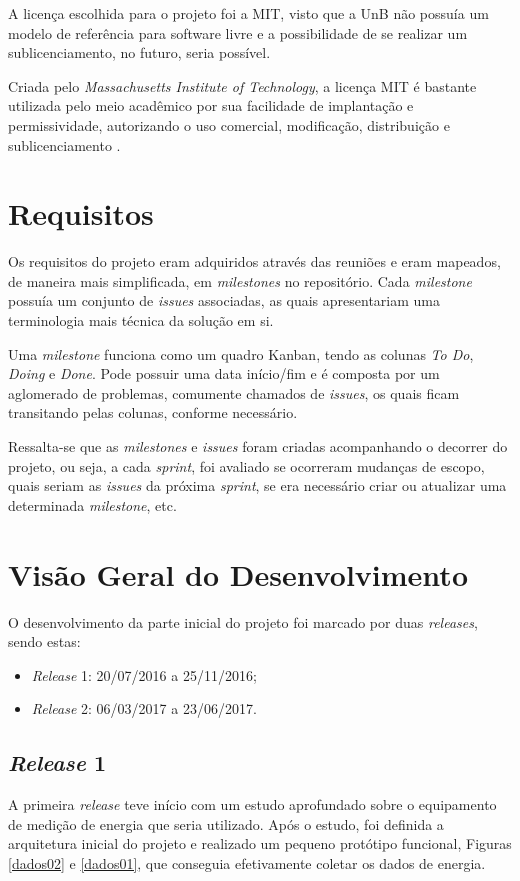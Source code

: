 A licença escolhida para o projeto foi a MIT, visto que a UnB não possuía um modelo de referência para software livre e a possibilidade de se realizar um sublicenciamento, no futuro, seria possível.

Criada pelo \textit{Massachusetts Institute of Technology}, a licença MIT é bastante utilizada pelo meio acadêmico por sua facilidade de implantação e permissividade, autorizando o uso comercial, modificação, distribuição e sublicenciamento \cite{mit_license}.

\section{Requisitos}
Os requisitos do projeto eram adquiridos através das reuniões e eram mapeados, de maneira mais simplificada, em \textit{milestones} \cite{gitlab} no repositório. Cada \textit{milestone} possuía um conjunto de \textit{issues} associadas, as quais apresentariam uma terminologia mais técnica da solução em si.

Uma \textit{milestone} funciona como um quadro Kanban, tendo as colunas \textit{To Do}, \textit{Doing} e \textit{Done}. Pode possuir uma data início/fim e é composta por um aglomerado de problemas, comumente chamados de \textit{issues}, os quais ficam transitando pelas colunas, conforme necessário.

Ressalta-se que as \textit{milestones} e \textit{issues} foram criadas acompanhando o decorrer do projeto, ou seja, a cada \textit{sprint}, foi avaliado se ocorreram mudanças de escopo, quais seriam as \textit{issues} da próxima \textit{sprint}, se era necessário criar ou atualizar uma determinada \textit{milestone}, etc.

\section{Visão Geral do Desenvolvimento}
O desenvolvimento da parte inicial do projeto foi marcado por duas \textit{releases}, sendo estas:

\begin{itemize}
    \item \textit{Release} 1: 20/07/2016 a 25/11/2016;
    \item \textit{Release} 2: 06/03/2017 a 23/06/2017.
\end{itemize}

\subsection{\textit{Release} 1}
A primeira \textit{release} teve início com um estudo aprofundado sobre o equipamento de medição de energia que seria utilizado. Após o estudo, foi definida a arquitetura inicial do projeto e realizado um pequeno protótipo funcional, Figuras \ref{dados02} e \ref{dados01}, que conseguia efetivamente coletar os dados de energia.

